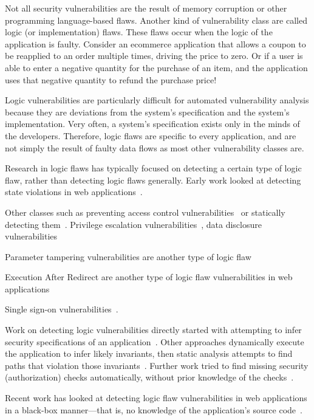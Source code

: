 \documentclass[11pt,letterpaper]{article}
\begin{document}
Not all security vulnerabilities are the result of memory corruption
or other programming language-based flaws. Another kind of
vulnerability class are called logic (or implementation) flaws. These
flaws occur when the logic of the application is faulty. Consider an
ecommerce application that allows a coupon to be reapplied to an order
multiple times, driving the price to zero. Or if a user is able to
enter a negative quantity for the purchase of an item, and the
application uses that negative quantity to refund the purchase price!

Logic vulnerabilities are particularly difficult for automated
vulnerability analysis because they are deviations from the
system's specification and the system's implementation. Very often, a
system's specification exists only in the minds of the developers.
Therefore, logic flaws are specific to every application, and are not
simply the result of faulty data flows as most other vulnerability
classes are.

Research in logic flaws has typically focused on detecting a certain
type of logic flaw, rather than detecting logic flaws generally. Early
work looked at detecting state violations in web
applications~\cite{Cova2007}.

Other classes such as preventing access control
vulnerabilities~\cite{dalton09:nemesis} or statically detecting
them~\cite{Sun2011}. Privilege escalation
vulnerabilities~\cite{Monshizadeh2014}, data disclosure
vulnerabilities~\cite{Muthukumaran2015}

Parameter tampering vulnerabilities are another type of logic
flaw~\cite{Bisht2010, Bisht2011}

Execution After Redirect are another type of logic flaw
vulnerabilities in web applications~\cite{Doupe2011, Payet2013}

Single sign-on vulnerabilities~\cite{Zhou2014}.

Work on detecting logic vulnerabilities directly started with
attempting to infer security specifications of an
application~\cite{tan08:autoises, Livshits2009a}. Other approaches dynamically
execute the application to infer likely invariants, then static
analysis attempts to find paths that violation those
invariants~\cite{felmetsger10:logic}. Further work tried to find missing
security (authorization) checks automatically, without prior knowledge
of the checks~\cite{Son2011, Son2013}.

Recent work has looked at detecting logic flaw vulnerabilities in web
applications in a black-box manner---that is, no knowledge of the
application's source code~\cite{Pellegrino2014}.
\end{document}
